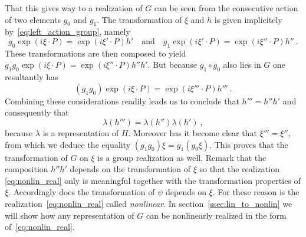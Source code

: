 \documentclass[11pt]{article}
\begin{document}
That this gives way to a realization of $G$ can be seen from the 
consecutive action of two elements $g_0$ and $g_1$. The 
transformation of $\xi$ and $h$ is given implicitely 
by~\eqref{eq:left_action_group}, namely
%
\begin{displaymath}
	g_0\exp(i\xi\cdot P) = \exp(i\xi'\cdot P) h' 
	\quad\text{and}\quad
	g_1\exp(i\xi'\cdot P) = \exp(i\xi''\cdot P) h''~.
\end{displaymath}
These transformations are then composed to yield 
$g_1g_0\exp(i\xi\cdot P) = \exp(i\xi''\cdot P)h''h'$. But because 
$g_1 \circ g_0$ also lies in $G$ one resultantly has
\begin{displaymath}
	(g_1g_0)\exp(i\xi\cdot P) = \exp(i\xi'''\cdot P) h'''~.
\end{displaymath}
Combining these considerations readily leads us to conclude that
$h''' = h''h'$ and consequently that 
%
\begin{displaymath}
	\lambda(h''') = \lambda(h'')\lambda(h')~,
\end{displaymath}
because $\lambda$ is a representation of $H$. Moreover has it 
become clear that $\xi''' = \xi''$, from which we deduce the 
equality $(g_1g_0)\xi = g_1(g_0\xi)$. This proves that the 
transformation of $G$ on $\xi$ is a group realization as well.  
Remark that the composition $h''h'$ depends on the transformation 
of $\xi$ so that the realization \eqref{eq:nonlin_real} only is 
meaningful together with the transformation properties of $\xi$.  
Accordingly does the transformation of $\psi$ depends on $\xi$.  
For these reason is the realization~\eqref{eq:nonlin_real} called 
\emph{nonlinear}. In section~\ref{ssec:lin_to_nonlin} we will 
show how any representation of $G$ can be nonlinearly realized in 
the form of~\eqref{eq:nonlin_real}.
\end{document}
